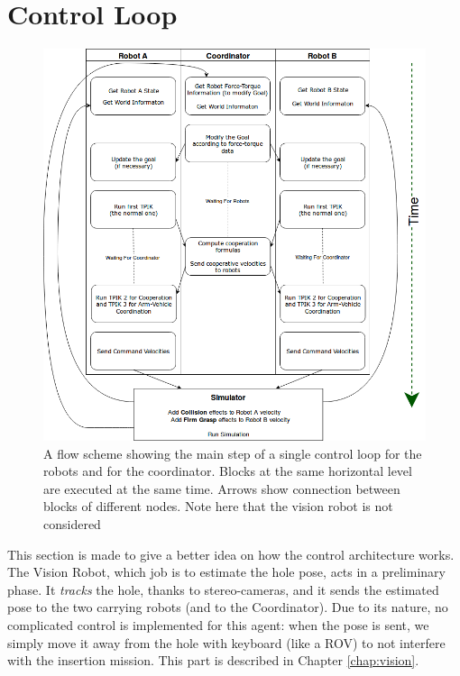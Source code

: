 \section{Control Loop}
\begin{figure}[H]
	\centering
	\includegraphics[width=12cm]{flowScheme.png}	
	\caption[Flow Scheme Control Loop]{A flow scheme showing the main step of a single control loop for the robots and for the coordinator. Blocks at the same horizontal level are executed at the same time. Arrows show connection between blocks of different nodes. Note here that the vision robot is not considered}
	\label{fig:flowScheme}
\end{figure}

This section is made to give a better idea on how the control architecture works.\\
The Vision Robot, which job is to estimate the hole pose, acts in a preliminary phase. It \textit{tracks} the hole, thanks to stereo-cameras, and it sends the estimated pose to the two carrying robots (and to the Coordinator). Due to its nature, no complicated control is implemented for this agent: when the pose is sent, we simply move it away from the hole with keyboard (like a ROV) to not interfere with the insertion mission. This part is described in Chapter \ref{chap:vision}.\\

